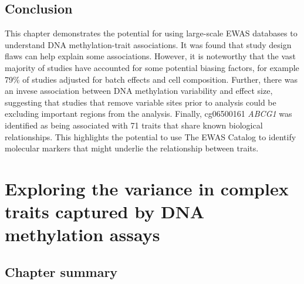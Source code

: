 \documentclass[11pt,oneside]{bristolthesis}
\begin{document}
\hypertarget{conclusion-04}{%
\section{Conclusion}\label{conclusion-04}}

This chapter demonstrates the potential for using large-scale EWAS databases to understand DNA methylation-trait associations. It was found that study design flaws can help explain some associations. However, it is noteworthy that the vast majority of studies have accounted for some potential biasing factors, for example 79\% of studies adjusted for batch effects and cell composition. Further, there was an invese association between DNA methylation variability and effect size, suggesting that studies that remove variable sites prior to analysis could be excluding important regions from the analysis. Finally, cg06500161 \emph{ABCG1} was identified as being associated with 71 traits that share known biological relationships. This highlights the potential to use The EWAS Catalog to identify molecular markers that might underlie the relationship between traits.

\hypertarget{h2ewas-chapter}{%
\chapter{Exploring the variance in complex traits captured by DNA methylation assays}\label{h2ewas-chapter}}

\hypertarget{chapter-summary-05}{%
\section{Chapter summary}\label{chapter-summary-05}}
\end{document}

